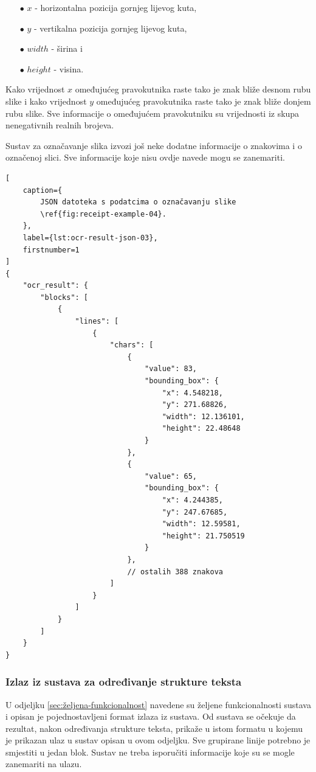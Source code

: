 \documentclass[times, utf8, zavrsni]{fer}
\begin{document}
\begin{itemize}
    \item[$\bullet$] $x$ - horizontalna pozicija gornjeg lijevog kuta,
    \item[$\bullet$] $y$ - vertikalna pozicija gornjeg lijevog kuta,
    \item[$\bullet$] $width$ - širina i
    \item[$\bullet$] $height$ - visina.
\end{itemize}

Kako vrijednost $x$ omeđujućeg pravokutnika raste tako je znak bliže desnom rubu
slike i kako vrijednost $y$ omeđujućeg pravokutnika raste tako je znak bliže
donjem rubu slike. Sve informacije o omeđujućem pravokutniku su vrijednosti iz
skupa nenegativnih realnih brojeva.

Sustav za označavanje slika izvozi još neke dodatne informacije o znakovima i
o označenoj slici. Sve informacije koje nisu ovdje navede mogu se zanemariti.

\pagebreak

\begin{lstlisting}[
    caption={
        JSON datoteka s podatcima o označavanju slike
        \ref{fig:receipt-example-04}.
    },
    label={lst:ocr-result-json-03},
    firstnumber=1
]
{
    "ocr_result": {
        "blocks": [
            {
                "lines": [
                    {
                        "chars": [
                            {
                                "value": 83,
                                "bounding_box": {
                                    "x": 4.548218,
                                    "y": 271.68826,
                                    "width": 12.136101,
                                    "height": 22.48648
                                }
                            },
                            {
                                "value": 65,
                                "bounding_box": {
                                    "x": 4.244385,
                                    "y": 247.67685,
                                    "width": 12.59581,
                                    "height": 21.750519
                                }
                            },
                            // ostalih 388 znakova
                        ]
                    }
                ]
            }
        ]
    }
}
\end{lstlisting}


\subsubsection{Izlaz iz sustava za određivanje strukture teksta}
U odjeljku \ref{sec:željena-funkcionalnost} navedene su željene funkcionalnosti
sustava i opisan je pojednostavljeni format izlaza iz sustava. Od sustava se
očekuje da rezultat, nakon određivanja strukture teksta, prikaže u istom formatu
u kojemu je prikazan ulaz u sustav opisan u ovom odjeljku. Sve grupirane linije
potrebno je smjestiti u jedan blok. Sustav ne treba isporučiti informacije koje
su se mogle zanemariti na ulazu.
\end{document}
